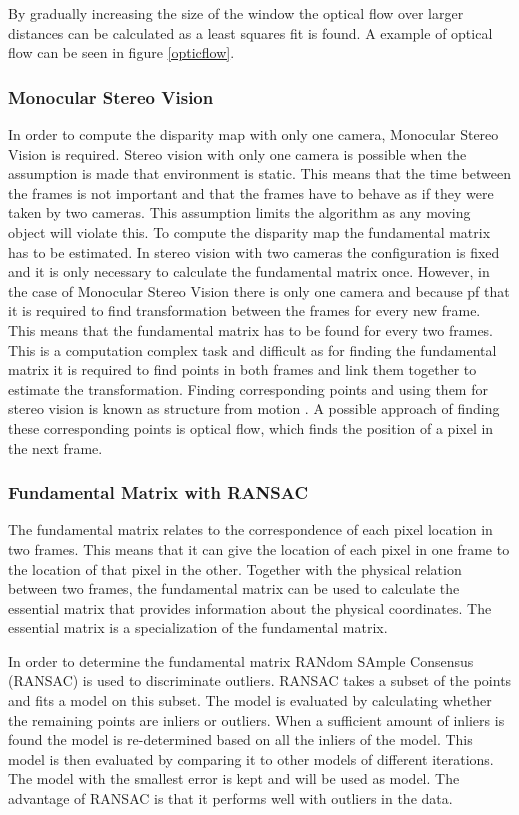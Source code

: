 \documentclass[a4paper]{article}
\begin{document}
By gradually increasing the size of the window the optical flow over larger distances can be calculated as a least squares fit is found. A example of optical flow can be seen in figure \ref{opticflow}.

\subsubsection{Monocular Stereo Vision}
In order to compute the disparity map with only one camera, Monocular Stereo Vision is required. Stereo vision with only one camera is possible when the assumption is made that environment is static. This means that the time between the frames is not important and that the frames have to behave as if they were taken by two cameras. This assumption limits the algorithm as any moving object will violate this. To compute the disparity map the fundamental matrix has to be estimated. In stereo vision with two cameras the configuration is fixed and it is only necessary to calculate the fundamental matrix once.  However, in the case of Monocular Stereo Vision there is only one camera and because pf that it is required to find transformation between the frames for every new frame. This means that the fundamental matrix has to be found for every two frames. This is a computation complex task and difficult as for finding the fundamental matrix it is required to find points in both frames and link them together to estimate the transformation. Finding corresponding points and using them for stereo vision is known as structure from motion \cite{Varga2005}. A possible approach of finding these corresponding points is optical flow, which finds the position of a pixel in the next frame.

\subsubsection{Fundamental Matrix with RANSAC}

The fundamental matrix relates to the correspondence of each pixel location in two frames. This means that it can give the location of each pixel in one frame to the location of that pixel in the other. Together with the physical relation between two frames, the fundamental matrix can be used to calculate the essential matrix \cite{Hartley2004} that provides information about the physical coordinates. The essential matrix is a specialization of the fundamental matrix. 

In order to determine the fundamental matrix RANdom SAmple Consensus (RANSAC) is used to discriminate outliers. RANSAC takes a subset of the points and fits a model on this subset. The model is evaluated by calculating whether the remaining points are inliers or outliers. When a sufficient amount of inliers is found the model is re-determined based on all the inliers of the model. This model is then evaluated by comparing it to other models of different iterations. The model with the smallest error is kept and will be used as model. The advantage of RANSAC is that it performs well with outliers in the data.
\end{document}
